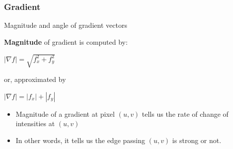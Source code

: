 \documentclass[english,11pt,table,handout]{beamer}
\begin{document}
\frame
{
	\frametitle{Gradient}
	
	\begin{block}{Magnitude and angle of gradient vectors}
		
		\textbf{Magnitude} of gradient is computed by:
		
		$|\nabla f|=  \sqrt{f_{x}^{2} + f_{y}^{2}}$
		
		or, approximated by
		
		$|\nabla f|=  |f_{x}| + |f_{y}|$
		
		\begin{itemize}
			\item Magnitude of a gradient at pixel $(u,v)$ tells us the rate of change of intensities at $(u,v)$
			\item In other words, it tells us the edge passing $(u,v)$ is strong or not.
		\end{itemize}
		
		
	\end{block}
	
}
\end{document}
